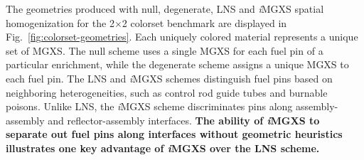 \documentclass[12pt,twoside]{mitthesis-exec}
\begin{document}
The geometries produced with null, degenerate, LNS and \textit{i}MGXS spatial homogenization for the 2$\times$2 colorset benchmark are displayed in Fig.~\ref{fig:colorset-geometries}. Each uniquely colored material represents a unique set of MGXS. The null scheme uses a single MGXS for each fuel pin of a particular enrichment, while the degenerate scheme assigns a unique MGXS to each fuel pin. The LNS and \textit{i}MGXS schemes distinguish fuel pins based on neighboring heterogeneities, such as control rod guide tubes and burnable poisons. Unlike LNS, the \textit{i}MGXS scheme discriminates pins along assembly-assembly and reflector-assembly interfaces. \textbf{The ability of \textit{i}MGXS to separate out fuel pins along interfaces without geometric heuristics illustrates one key advantage of \textit{i}MGXS over the LNS scheme.}

\end{document}
